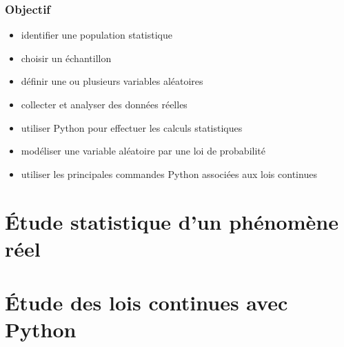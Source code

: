 \documentclass[11pt, a4paper]{article}
\begin{document}
	
	\tpage
	\renewcommand{\author}{Thibauld, Benjamin, Amritesh}
	\tableofcontents\newpage
	\section*{Objectif}
	\begin{itemize}[label=$\Diamond$]
		\item identifier une population statistique
		\item choisir un échantillon
		\item définir une ou plusieurs variables aléatoires
		\item collecter et analyser des données réelles 
		\item utiliser Python pour effectuer les calculs statistiques 
		\item modéliser une variable aléatoire par une loi de probabilité 
		\item utiliser les principales commandes Python associées aux lois continues
	\end{itemize}
	\newpage
	\part{Étude statistique d’un phénomène réel}
	
	\newpage
	\part{Étude des lois continues avec Python}
	
	
	\epage
	
\end{document}
